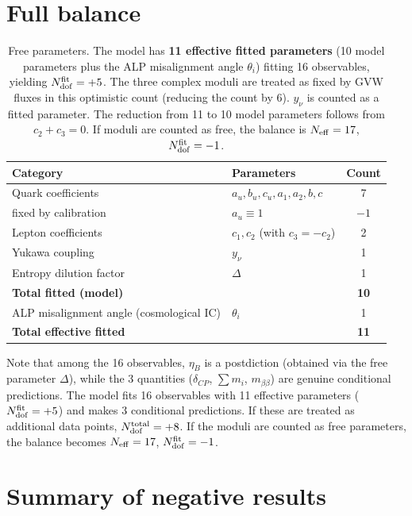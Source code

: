 \documentclass[12pt,a4paper]{article}
\numberwithin{equation}{section}
\begin{document}
\section{Full balance}
\label{sec:balance}
\begin{table}[H]
\centering
\caption{Free parameters. The model has \textbf{11 effective fitted parameters} (10 model parameters plus the ALP misalignment angle \(\theta_i\)) fitting 16 observables, yielding \(N_{\rm dof}^{\rm fit} = +5\). The three complex moduli are treated as fixed by GVW fluxes in this optimistic count (reducing the count by 6). \(y_\nu\) is counted as a fitted parameter. The reduction from 11 to 10 model parameters follows from \(c_2 + c_3 = 0\). If moduli are counted as free, the balance is \(N_{\rm eff} = 17\), \(N_{\rm dof}^{\rm fit} = -1\).}
\begin{tabular}{llc}
\toprule
Category & Parameters & Count \\
\midrule
Quark coefficients & \(a_u, b_u, c_u, a_1, a_2, b, c\) & 7 \\
\quad fixed by calibration & \(a_u \equiv 1\) & \(-1\) \\
Lepton coefficients & \(c_1, c_2\) (with \(c_3 = -c_2\)) & 2 \\
Yukawa coupling & \(y_\nu\) & 1 \\
Entropy dilution factor & \(\Delta\) & 1 \\
\midrule
\textbf{Total fitted (model)} & & \textbf{10} \\
\midrule
ALP misalignment angle (cosmological IC) & \(\theta_i\) & 1 \\
\midrule
\textbf{Total effective fitted} & & \textbf{11} \\
\bottomrule
\end{tabular}
\end{table}

Note that among the 16 observables, \(\eta_B\) is a postdiction (obtained via the free parameter \(\Delta\)), while the 3 quantities (\(\delta_{CP}\), \(\sum m_i\), \(m_{\beta\beta}\)) are genuine conditional predictions. The model fits 16 observables with 11 effective parameters (\(N_{\rm dof}^{\rm fit} = +5\)) and makes 3 conditional predictions. If these are treated as additional data points, \(N_{\rm dof}^{\rm total} = +8\). If the moduli are counted as free parameters, the balance becomes \(N_{\rm eff} = 17\), \(N_{\rm dof}^{\rm fit} = -1\).

\section{Summary of negative results}
\label{sec:negative_summary}
\end{document}
